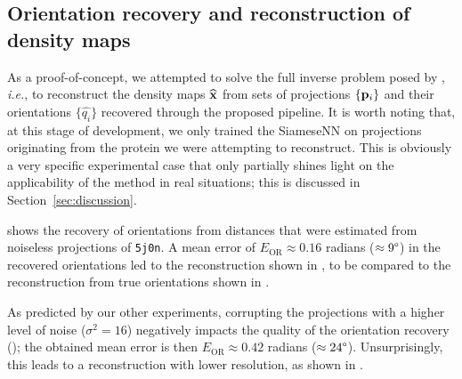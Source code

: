 
\subsection{Orientation recovery and reconstruction of density maps}\label{sec:results:orientation-recovery:reconstruction}


As a proof-of-concept, we attempted to solve the full inverse problem posed by , \textit{i.e.}, to reconstruct the density maps $\widehat{\mathbf{x}}$ from sets of projections $\{ \mathbf{p}_i \}$ and their orientations $\{ \widehat{q_i} \}$ recovered through the proposed pipeline.
It is worth noting that, at this stage of development, we only trained the SiameseNN on projections originating from the protein we were attempting to reconstruct. This is obviously a very specific experimental case that only partially shines light on the applicability of the method in real situations; this is discussed in Section~\ref{sec:discussion}.

 shows the recovery of orientations from distances that were estimated from noiseless projections of \texttt{5j0n}.
A mean error of $E_\text{OR} \approx 0.16$ radians ($\approx 9\degree$) in the recovered orientations led to the reconstruction shown in , to be compared to the reconstruction from true orientations shown in .

As predicted by our other experiments, corrupting the projections with a higher level of noise ($\sigma^2=16$) negatively impacts the quality of the orientation recovery (); the obtained mean error is then $E_\text{OR} \approx 0.42$ radians ($\approx 24\degree$).
Unsurprisingly, this leads to a reconstruction with lower resolution, as shown in .

